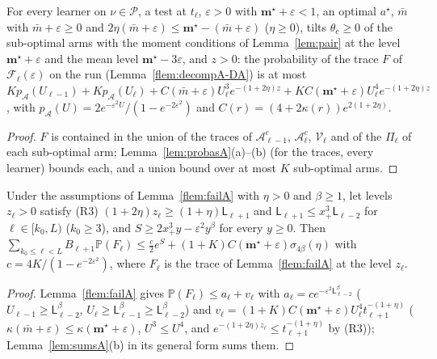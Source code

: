\documentclass[11pt]{article}
\newcommand{\PP}{\mathbb{P}}
\newcommand{\cP}{\mathcal P}
\begin{document}
\begin{lemma}\label{flem:failA}
For every learner on $\nu\in\cP$, a test at $t_\ell$, $\varepsilon>0$ with $\mathbf
m^\star+\varepsilon<1$, an optimal $a^\star$, $\bar m$ with $\bar m+\varepsilon\ge0$ and
$2\eta(\bar m+\varepsilon)\le\mathbf m^\star-(\bar m+\varepsilon)$ ($\eta\ge0$), tilts
$\theta_c\ge0$ of the sub-optimal arms with the moment conditions of Lemma~\ref{lem:pair} at the
level $\mathbf m^\star+\varepsilon$ and the mean level $\mathbf m^\star-3\varepsilon$, and $z>0$: the
probability of the trace $F$ of $\mathcal F_\ell(\varepsilon)$ on the run
(Lemma~\ref{flem:decompA-DA}) is at most
$Kp_{\mathcal A}(U_{\ell-1})+Kp_{\mathcal A}(U_\ell)+C(\bar m+\varepsilon)U_\ell^3e^{-(1+2\eta)z}+
KC(\mathbf m^\star+\varepsilon)U_\ell^4e^{-(1+2\eta)z}$, with
$p_{\mathcal A}(U)=2e^{-\varepsilon^2U}/(1-e^{-2\varepsilon^2})$ and
$C(r)=(4+2\kappa(r))e^{2(1+2\eta)}$.
\end{lemma}

\begin{proof}
$F$ is contained in the union of the traces of $\mathcal A_{\ell-1}^c$, $\mathcal A_\ell^c$,
$\mathcal V_\ell$ and of the $\Pi_\ell$ of each sub-optimal arm; Lemma~\ref{lem:probasA}(a)--(b)
(for the traces, every learner) bounds each, and a union bound over at most $K$ sub-optimal arms.
\end{proof}

\begin{lemma}\label{flem:failA-sum}
Under the assumptions of Lemma~\ref{flem:failA} with $\eta>0$ and $\beta\ge1$, let levels $z_\ell>0$
satisfy (R3) $(1+2\eta)z_\ell\ge(1+\eta)\mathsf L_{\ell+1}$ and $\mathsf L_{\ell+1}\le x_+^3\mathsf
L_{\ell-2}$ for $\ell\in[k_0,L)$ ($k_0\ge3$), and $S\ge2x_+^3y-\varepsilon^2y^\beta$ for every
$y\ge0$. Then
$\sum_{k_0\le\ell<L}B_{\ell+1}\PP(F_\ell)\le\frac c2e^S+(1+K)C(\mathbf
m^\star+\varepsilon)\sigma_{4\beta}(\eta)$ with $c=4K/(1-e^{-2\varepsilon^2})$, where $F_\ell$ is
the trace of Lemma~\ref{flem:failA} at the level $z_\ell$.
\end{lemma}

\begin{proof}
Lemma~\ref{flem:failA} gives $\PP(F_\ell)\le a_\ell+v_\ell$ with
$a_\ell=ce^{-\varepsilon^2\mathsf L_{\ell-2}^\beta}$ ($U_{\ell-1}\ge\mathsf L_{\ell-2}^\beta$,
$U_\ell\ge\mathsf L_{\ell-1}^\beta\ge\mathsf L_{\ell-2}^\beta$) and $v_\ell=(1+K)C(\mathbf
m^\star+\varepsilon)U_\ell^4t_{\ell+1}^{-(1+\eta)}$ ($\kappa(\bar m+\varepsilon)\le\kappa(\mathbf
m^\star+\varepsilon)$, $U^3\le U^4$, and $e^{-(1+2\eta)z_\ell}\le t_{\ell+1}^{-(1+\eta)}$ by (R3));
Lemma~\ref{lem:sumsA}(b) in its general form sums them.
\end{proof}
\end{document}
